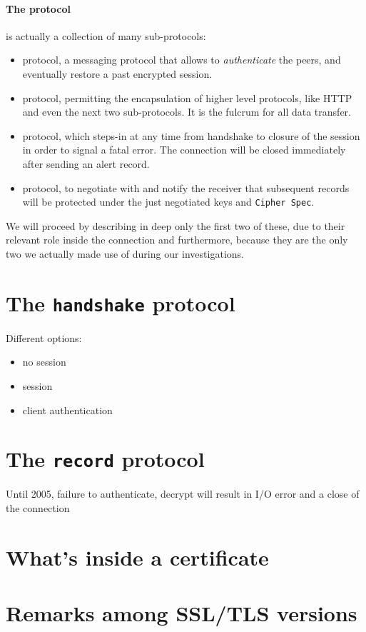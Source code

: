 \paragraph{The protocol} is actually a collection of many sub-protocols:
\begin{itemize}
  \setlength{\itemsep}{1pt}
  \setlength{\parskip}{0pt}
  \setlength{\parsep}{0pt}
\item {} protocol, a messaging protocol that allows to
  \emph{authenticate} the peers, and eventually restore a past encrypted
  session.
\item {} protocol, permitting the encapsulation of higher level protocols,
  like HTTP and even the next two sub-protocols. It is the fulcrum for all data
  transfer.
\item {} protocol, which steps-in at any time from handshake to closure of the
  session in order to signal a fatal error. The connection will be closed
  immediately after sending an alert record.
\item {} protocol, to negotiate with and notify  the receiver that
  subsequent records will be protected under the just negotiated keys and
  \texttt{Cipher Spec}.
\end{itemize}
We will proceed by describing in deep only the first two of these, due to their
relevant role inside the connection and furthermore, because they are the only
two we actually made use of during our investigations.


\section{The \texttt{handshake} protocol}
Different options:
\begin{itemize}
\item no session
\item session
\item client authentication
\end{itemize}


\section{The \texttt{record} protocol}

Until 2005, failure to authenticate, decrypt will result in I/O error and a
close of the connection

\section{What's inside a certificate \label{sec:ssl:x509}}

\section{Remarks among SSL/TLS versions}



